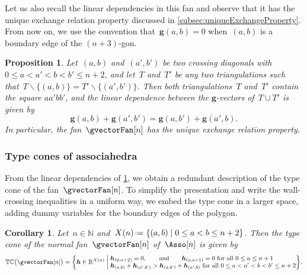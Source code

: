 \documentclass{amsart}
\newtheorem{corollary}[theorem]{Corollary}
\newtheorem{proposition}[theorem]{Proposition}
\theoremstyle{definition}
\newcommand{\R}{\mathbb{R}} %
\newcommand{\N}{\mathbb{N}} %
\renewcommand{\b}[1]{{\boldsymbol{#1}}} %
\newcommand{\set}[2]{\left\{ #1 \;\middle|\; #2 \right\}} %
\newcommand{\ssm}{\smallsetminus} %
\newcommand{\eqdef}{\mbox{\,\raisebox{0.2ex}{\scriptsize\ensuremath{\mathrm:}}\ensuremath{=}\,}} %
\newcommand{\gvector}[1]{\b{g}(#1)} %
\newcommand{\typeCone}{\mathbb{TC}} %
\begin{document}
Let us also recall the linear dependencies in this fan and observe that it has the unique exchange relation property discussed in \cref{subsec:uniqueExchangeProperty}.
From now on, we use the convention that~$\gvector{a,b} = 0$ when~$(a,b)$ is a boundary edge of the $(n+3)$-gon.

\begin{proposition}
\label{prop:exchangeablePairsAsso}
Let~$(a,b)$ and~$(a',b')$ be two crossing diagonals with~${0 \le a < a' < b < b' \le n+2}$, and let~$T$ and~$T'$ be any two triangulations such that~$T \ssm \{(a,b)\} = T' \ssm \{(a',b')\}$.
Then both triangulations~$T$ and~$T'$ contain the square $aa'bb'$, and the linear dependence between the $\b{g}$-vectors of~$T \cup T'$ is given by
\[
\gvector{a,b} + \gvector{a',b'} = \gvector{a,b'} + \gvector{a',b}.
\]
In particular, the fan~$\gvectorFan[n]$ has the unique exchange relation property.
\end{proposition}


\subsubsection{Type cones of associahedra}

From the linear dependencies of \cref{prop:exchangeablePairsAsso}, we obtain a redundant description of the type cone of the fan~$\gvectorFan[n]$.
To simplify the presentation and write the wall-crossing inequalities in a uniform way, we embed the type cone in a larger space, adding dummy variables for the boundary edges of the polygon.

\begin{corollary}
\label{coro:typeConeAsso}
Let~$n \in \N$ and~$X(n) \eqdef \set{(a,b)}{0 \le a < b \le n+2}$. Then the type cone of the normal fan~$\gvectorFan[n]$ of~$\Asso[n]$ is given by
\[
\typeCone \big( \gvectorFan[n] \big) = \set{\b{h} \in \R^{X(n)}}{\begin{array}{@{}l@{}} \b{h}_{(0,n+2)} = 0, \qquad\text{and}\qquad \b{h}_{(a,a+1)} = 0 \text{ for all } 0 \le a \le n+1 \\ \b{h}_{(a,b)} + \b{h}_{(a',b')} > \b{h}_{(a,b')} + \b{h}_{(a',b)} \text{ for all } 0 \le a < a' < b < b' \le n+2 \end{array}} \!.
\]
\end{corollary}

\pagebreak
\end{document}
